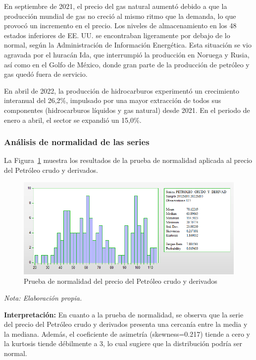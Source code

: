 \documentclass[
  a4paper,
]{article}
\begin{document}
En septiembre de 2021, el precio del gas natural aumentó debido a que la
producción mundial de gas no creció al mismo ritmo que la demanda, lo
que provocó un incremento en el precio. Los niveles de almacenamiento en
los 48 estados inferiores de EE. UU. se encontraban ligeramente por
debajo de lo normal, según la Administración de Información Energética.
Esta situación se vio agravada por el huracán Ida, que interrumpió la
producción en Noruega y Rusia, así como en el Golfo de México, donde
gran parte de la producción de petróleo y gas quedó fuera de servicio.

En abril de 2022, la producción de hidrocarburos experimentó un
crecimiento interanual del 26,2\%, impulsado por una mayor extracción de
todos sus componentes (hidrocarburos líquidos y gas natural) desde 2021.
En el periodo de enero a abril, el sector se expandió un 15,0\%.

\hypertarget{anuxe1lisis-de-normalidad-de-las-series}{%
\subsubsection{Análisis de normalidad de las
series}\label{anuxe1lisis-de-normalidad-de-las-series}}

La Figura~\ref{fig-5} muestra los resultados de la prueba de normalidad
aplicada al precio del Petróleo crudo y derivados.

\begin{figure}

\caption{\label{fig-5}Prueba de normalidad del precio del Petróleo crudo
y derivados}

{\centering \includegraphics{20230603090708.png}

}

\end{figure}

\emph{Nota: Elaboración propia.}

\textbf{Interpretación:} En cuanto a la prueba de normalidad, se observa
que la serie del precio del Petróleo crudo y derivados presenta una
cercanía entre la media y la mediana. Además, el coeficiente de
asimetría (skewness=0.217) tiende a cero y la kurtosis tiende débilmente
a 3, lo cual sugiere que la distribución podría ser normal.
\end{document}
